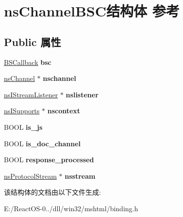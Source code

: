 \hypertarget{structns_channel_b_s_c}{}\section{ns\+Channel\+B\+S\+C结构体 参考}
\label{structns_channel_b_s_c}
\subsection*{Public 属性}
\begin{DoxyCompactItemize}
\item 
\mbox{\label{structns_channel_b_s_c_a5a5f25c28c6680a011e75914803ca8c8}} 
\hyperlink{struct_b_s_callback}{B\+S\+Callback} {\bfseries bsc}
\item 
\mbox{\label{structns_channel_b_s_c_a12df2d6e88f95ee90e7441eb8ecca9d9}} 
\hyperlink{structns_channel}{ns\+Channel} $\ast$ {\bfseries nschannel}
\item 
\mbox{\label{structns_channel_b_s_c_a53169e417c5b3d55ee7877b6fe299bb3}} 
\hyperlink{interfacens_i_stream_listener}{ns\+I\+Stream\+Listener} $\ast$ {\bfseries nslistener}
\item 
\mbox{\label{structns_channel_b_s_c_a2953821f4b27103369f6055bda3454f8}} 
\hyperlink{interfacens_i_supports}{ns\+I\+Supports} $\ast$ {\bfseries nscontext}
\item 
\mbox{\label{structns_channel_b_s_c_a19c17020481f8871010250fccc73afae}} 
B\+O\+OL {\bfseries is\+\_\+js}
\item 
\mbox{\label{structns_channel_b_s_c_a5e4da3c3a357f4a13d5b17b9546bb1bc}} 
B\+O\+OL {\bfseries is\+\_\+doc\+\_\+channel}
\item 
\mbox{\label{structns_channel_b_s_c_aaef03989486aa01d0e0461a9d8264752}} 
B\+O\+OL {\bfseries response\+\_\+processed}
\item 
\mbox{\label{structns_channel_b_s_c_ae615c100384bbbb14a86abd14fdef282}} 
\hyperlink{structns_protocol_stream}{ns\+Protocol\+Stream} $\ast$ {\bfseries nsstream}
\end{DoxyCompactItemize}


该结构体的文档由以下文件生成\+:\begin{DoxyCompactItemize}
\item 
E\+:/\+React\+O\+S-\/0../dll/win32/mshtml/binding.\+h\end{DoxyCompactItemize}
